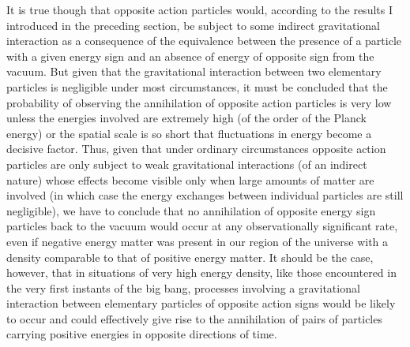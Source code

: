 \documentclass[notitlepage,12pt]{report}
\begin{document}
It is true though that opposite action particles would, according to the results I introduced in the preceding section, be subject to some indirect gravitational interaction as a consequence of the equivalence between the presence of a particle with a given energy sign and an absence of energy of opposite sign from the vacuum. But given that the gravitational interaction between two elementary particles is negligible under most circumstances, it must be concluded that the probability of observing the annihilation of opposite action particles is very low unless the energies involved are extremely high (of the order of the Planck energy) or the spatial scale is so short that fluctuations in energy become a decisive factor. Thus, given that under ordinary circumstances opposite action particles are only subject to weak gravitational interactions (of an indirect nature) whose effects become visible only when large amounts of matter are involved (in which case the energy exchanges between individual particles are still negligible), we have to conclude that no annihilation of opposite energy sign particles back to the vacuum would occur at any observationally significant rate, even if negative energy matter was present in our region of the universe with a density comparable to that of positive energy matter. It should be the case, however, that in situations of very high energy density, like those encountered in the very first instants of the big bang, processes involving a gravitational interaction between elementary particles of opposite action signs would be likely to occur and could effectively give rise to the annihilation of pairs of particles carrying positive energies in opposite directions of time.
\end{document}
